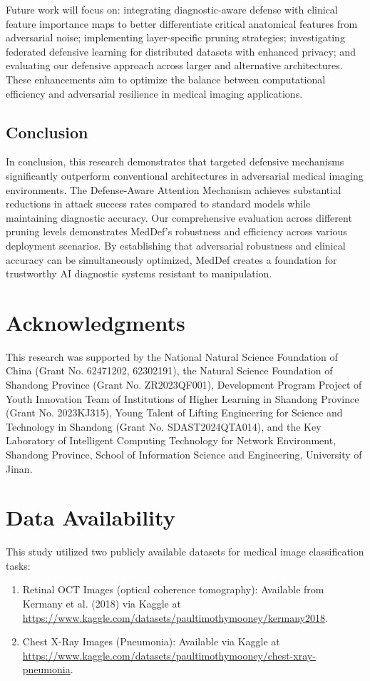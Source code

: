 \documentclass[preprint,12pt]{elsarticle}
\begin{document}
Future work will focus on: integrating diagnostic-aware defense with clinical feature importance maps to better differentiate critical anatomical features from adversarial noise; implementing layer-specific pruning strategies; investigating federated defensive learning for distributed datasets with enhanced privacy; and evaluating our defensive approach across larger and alternative architectures. These enhancements aim to optimize the balance between computational efficiency and adversarial resilience in medical imaging applications.

\subsection{Conclusion}
In conclusion, this research demonstrates that targeted defensive mechanisms significantly outperform conventional architectures in adversarial medical imaging environments. The Defense-Aware Attention Mechanism achieves substantial reductions in attack success rates compared to standard models while maintaining diagnostic accuracy. Our comprehensive evaluation across different pruning levels demonstrates MedDef's robustness and efficiency across various deployment scenarios. By establishing that adversarial robustness and clinical accuracy can be simultaneously optimized, MedDef creates a foundation for trustworthy AI diagnostic systems resistant to manipulation.

\section*{Acknowledgments}
This research was supported by the National Natural Science Foundation of China (Grant No. 62471202, 62302191), the Natural Science Foundation of Shandong Province (Grant No. ZR2023QF001), Development Program Project of Youth Innovation Team of Institutions of Higher Learning in Shandong Province (Grant No. 2023KJ315), Young Talent of Lifting Engineering for Science and Technology in Shandong (Grant No. SDAST2024QTA014), and the Key Laboratory of Intelligent Computing Technology for Network Environment, Shandong Province, School of Information Science and Engineering, University of Jinan.

\section*{Data Availability}
This study utilized two publicly available datasets for medical image classification tasks:
\begin{enumerate}
\item Retinal OCT Images (optical coherence tomography): Available from Kermany et al. (2018) via Kaggle at \\
\url{https://www.kaggle.com/datasets/paultimothymooney/kermany2018}.
\item Chest X-Ray Images (Pneumonia): Available via Kaggle at \\
\url{https://www.kaggle.com/datasets/paultimothymooney/chest-xray-pneumonia}.
\end{enumerate}
\end{document}
